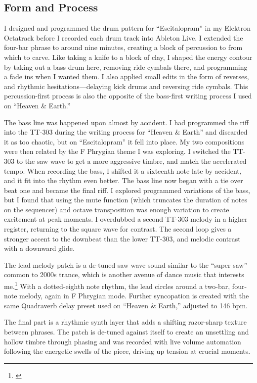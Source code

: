 \documentclass[12pt,twoside]{reedthesis}
\begin{document}
\subsection{Form and Process}

I designed and programmed the drum pattern for ``Escitalopram'' in my Elektron Octatrack before I recorded each drum track into Ableton Live. I extended the four-bar phrase to around nine minutes, creating a block of percussion to from which to carve. Like taking a knife to a block of clay, I shaped the energy contour by taking out a bass drum here, removing ride cymbals there, and programming a fade ins when I wanted them. I also applied small edits in the form of reverses, and rhythmic hesitations---delaying kick drums and reversing ride cymbals. This percussion-first process is also the opposite of the bass-first writing process I used on ``Heaven {\&} Earth.''

The bass line was happened upon almost by accident. I had programmed the riff into the TT-303 during the writing process for ``Heaven {\&} Earth'' and discarded it as too chaotic, but on ``Escitalopram'' it fell into place. My two compositions were then related by the F Phrygian theme I was exploring. I switched the TT-303 to the saw wave to get a more aggressive timbre, and match the accelerated tempo. When recording the bass, I shifted it a sixteenth note late by accident, and it fit into the rhythm even better. The bass line now began with a tie over beat one and became the final riff. I explored programmed variations of the bass, but I found that using the mute function (which truncates the duration of notes on the sequencer) and octave transposition was enough variation to create excitement at peak moments. I overdubbed a second TT-303 melody in a higher register, returning to the square wave for contrast. The second loop gives a stronger accent to the downbeat than the lower TT-303, and melodic contrast with a downward glide.

The lead melody patch is a de-tuned saw wave sound similar to the ``super saw'' common to 2000s trance, which is another avenue of dance music that interests me.\footnote{\cite{turbodudeDemonstrationRolandJP80002011}}  With a dotted-eighth note rhythm, the lead circles around a two-bar, four-note melody, again in F Phrygian mode. Further syncopation is created with the same Quadraverb delay preset used on ``Heaven {\&} Earth,'' adjusted to 146 bpm.

The final part is a rhythmic synth layer that adds a shifting razor-sharp texture between phrases. The patch is de-tuned against itself to create an unsettling and hollow timbre through phasing and was recorded with live volume automation following the energetic swells of the piece, driving up tension at crucial moments.
\end{document}
